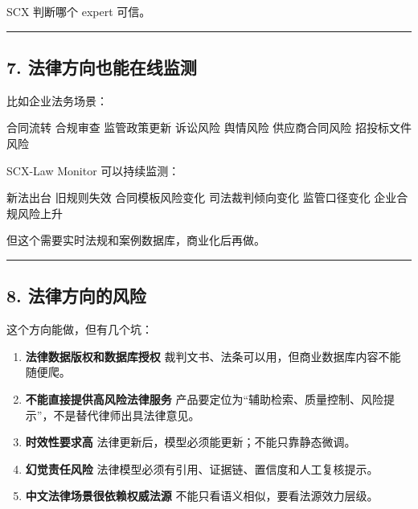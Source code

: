 \documentclass[
  12pt,
]{ctexart}
\newenvironment{Shaded}{}{}
\newcommand{\NormalTok}[1]{#1}
\begin{document}
SCX 判断哪个 expert 可信。

\begin{center}\rule{0.5\linewidth}{0.5pt}\end{center}

\subsection{7.
法律方向也能在线监测}\label{ux6cd5ux5f8bux65b9ux5411ux4e5fux80fdux5728ux7ebfux76d1ux6d4b}

比如企业法务场景：

\begin{Shaded}
\begin{Highlighting}[]
\NormalTok{合同流转}
\NormalTok{合规审查}
\NormalTok{监管政策更新}
\NormalTok{诉讼风险}
\NormalTok{舆情风险}
\NormalTok{供应商合同风险}
\NormalTok{招投标文件风险}
\end{Highlighting}
\end{Shaded}

SCX-Law Monitor 可以持续监测：

\begin{Shaded}
\begin{Highlighting}[]
\NormalTok{新法出台}
\NormalTok{旧规则失效}
\NormalTok{合同模板风险变化}
\NormalTok{司法裁判倾向变化}
\NormalTok{监管口径变化}
\NormalTok{企业合规风险上升}
\end{Highlighting}
\end{Shaded}

但这个需要实时法规和案例数据库，商业化后再做。

\begin{center}\rule{0.5\linewidth}{0.5pt}\end{center}

\subsection{8.
法律方向的风险}\label{ux6cd5ux5f8bux65b9ux5411ux7684ux98ceux9669}

这个方向能做，但有几个坑：

\begin{enumerate}
\def\labelenumi{\arabic{enumi}.}
\item
  \textbf{法律数据版权和数据库授权}
  裁判文书、法条可以用，但商业数据库内容不能随便爬。
\item
  \textbf{不能直接提供高风险法律服务}
  产品要定位为``辅助检索、质量控制、风险提示''，不是替代律师出具法律意见。
\item
  \textbf{时效性要求高} 法律更新后，模型必须能更新；不能只靠静态微调。
\item
  \textbf{幻觉责任风险}
  法律模型必须有引用、证据链、置信度和人工复核提示。
\item
  \textbf{中文法律场景很依赖权威法源}
  不能只看语义相似，要看法源效力层级。
\end{enumerate}
\end{document}
